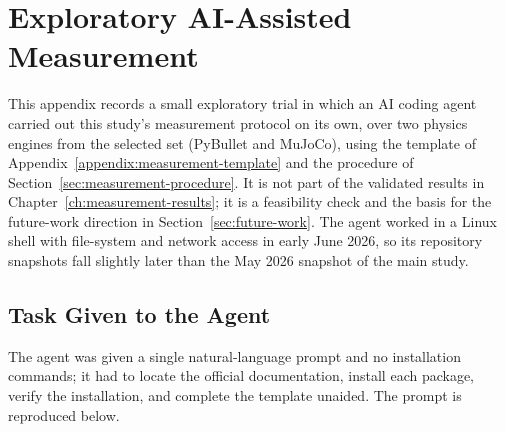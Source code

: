 \chapter{Exploratory AI-Assisted Measurement}
\label{appendix:ai-assisted-measurement}

This appendix records a small exploratory trial in which an AI coding agent
carried out this study's measurement protocol on its own, over two physics
engines from the selected set (PyBullet and MuJoCo), using the template of
Appendix~\ref{appendix:measurement-template} and the procedure of
Section~\ref{sec:measurement-procedure}. It is not part of the validated results
in Chapter~\ref{ch:measurement-results}; it is a feasibility check and the basis
for the future-work direction in Section~\ref{sec:future-work}. The agent worked
in a Linux shell with file-system and network access in early June 2026, so its
repository snapshots fall slightly later than the May 2026 snapshot of the main
study.

\section*{Task Given to the Agent}

The agent was given a single natural-language prompt and no installation commands;
it had to locate the official documentation, install each package, verify the
installation, and complete the template unaided. The prompt is reproduced below.

